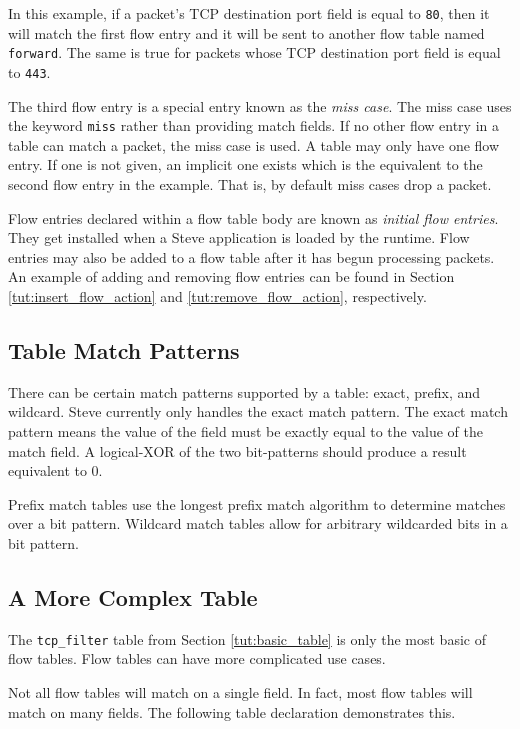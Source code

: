 In this example, if a packet's TCP destination port field is equal to \texttt{80},
then it will match the first flow entry and it will be sent to another flow table
named \texttt{forward}. The same is true for packets whose TCP destination
port field is equal to \texttt{443}.

The third flow entry is a special entry known as the \textit{miss case}. The miss 
case uses the keyword \texttt{miss} rather than providing match fields. If no 
other flow entry in a table can match a packet, the miss case is used. A table 
may only have one flow entry. If one is not given, an implicit one exists which 
is the equivalent to the second flow entry in the example. That is, by default 
miss cases drop a packet.

Flow entries declared within a flow table body are known
as \textit{initial flow entries}. 
They get installed when a Steve application is loaded by the runtime.
Flow entries may also be added to a flow table after it has begun processing packets. 
An example of adding and removing flow entries can be found in Section \ref{tut:insert_flow_action} and \ref{tut:remove_flow_action}, respectively.

\subsection{Table Match Patterns} \label{tut:match_patterns}

There can be certain match patterns supported by a table: exact, prefix, and wildcard. Steve currently only handles the exact match pattern. The exact match pattern means the value of the field must be exactly equal to the value of the match field. A logical-XOR of the two bit-patterns should produce a result equivalent to 0.

Prefix match tables use the longest prefix match algorithm to determine
matches over a bit pattern.
Wildcard match tables allow for arbitrary wildcarded bits in a bit pattern.

\subsection{A More Complex Table} \label{tut:complex_table}

The \texttt{tcp\_filter} table from Section \ref{tut:basic_table} is only the most basic of flow tables. 
Flow tables can have more complicated use cases.

Not all flow tables will match on a single field. In fact, most flow tables will
match on many fields. The following table declaration demonstrates this.

